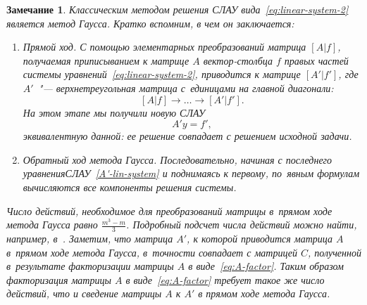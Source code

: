 \documentclass[11pt,a4paper,twoside]{report}
\numberwithin{equation}{section}
\theoremstyle{definition}
\theoremstyle{plain}
\newtheorem*{note*}{Замечание}
\begin{document}
\begin{note*}
    Классическим методом решения СЛАУ вида~\eqref{eq:linear-system-2}
    является метод Гаусса. Кратко вспомним, в чем он заключается:
    \begin{enumerate}
        \item Прямой ход. С помощью элементарных преобразований матрица $[A|f]$,
        получаемая приписыванием к матрице $A$ вектор-столбца $f$ правых частей
        системы уравнений~\eqref{eq:linear-system-2},
        приводится к матрице $[A'|f']$, где $A'$~"--- верхнетреугольная
        матрица с~единицами на главной диагонали:
        $$
            [A|f] \rightarrow \ldots \rightarrow [A'|f'].
        $$
        На этом этапе мы получили новую СЛАУ
        \begin{equation}
            \label{A'-lin-system}
            A'y=f',
        \end{equation}
        эквивалентную данной: ее решение совпадает с решением исходной задачи.
        \item Обратный ход метода Гаусса. Последовательно, начиная с последнего
        уравнения\linebreak СЛАУ~\eqref{A'-lin-system} и поднимаясь к первому,
        по~явным формулам вычисляются все компоненты решения системы.
    \end{enumerate}
    Число действий, необходимое для преобразований матрицы в~прямом ходе метода
    Гаусса равно $\frac{m^3 - m}{3}$. Подробный подсчет числа действий можно
    найти, например, в~\cite{KostFav}. Заметим, что матрица $A'$, к которой
    приводится матрица $A$ в~прямом ходе метода Гаусса, в~точности совпадает
    с матрицей $C$, полученной в~результате факторизации матрицы $A$
    в виде~\eqref{eq:A-factor}. Таким образом факторизация матрицы $A$ в
    виде~\eqref{eq:A-factor} требует такое же число действий, что и сведение
    матрицы $A$ к $A'$ в прямом ходе метода Гаусса.
\end{note*}
%
\end{document}
